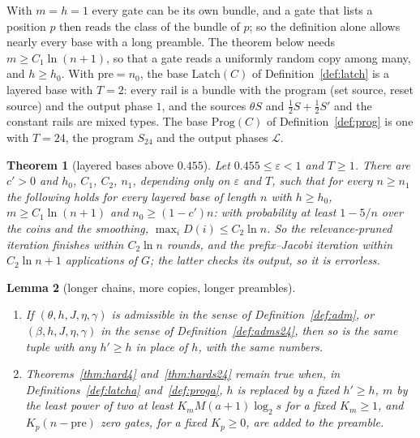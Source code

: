 \documentclass[11pt]{amsart}
\newtheorem{theorem}{Theorem}
\newtheorem{lemma}[theorem]{Lemma}
\theoremstyle{definition}
\theoremstyle{remark}
\newcommand{\eps}{\varepsilon}
\begin{document}
\noindent With $m=h=1$ every gate can be its own bundle, and a gate that lists a position $p$ then
reads the class of the bundle of $p$; so the definition alone allows nearly every base with a
long preamble. The theorem below needs $m\ge C_1\ln(n+1)$, so that a gate reads a uniformly random
copy among many, and $h\ge h_0$. With $\mathrm{pre}=n_0$, the base $\mathrm{Latch}(C)$ of
Definition~\ref{def:latch} is a layered base with $T=2$: every rail is a bundle with the program (set source, reset source) and
the output phase $1$, and the sources $\theta S$ and $\frac12S+\frac12S'$ and the constant rails are
mixed types. The base $\mathrm{Prog}(C)$ of Definition~\ref{def:prog} is one with $T=24$, the
program $S_{24}$ and the output phases $\mathcal L$.

\begin{theorem}[layered bases above $0.455$]\label{thm:layered}
Let $0.455\le\eps<1$ and $T\ge1$. There are $c'>0$ and $h_0$, $C_1$, $C_2$, $n_1$, depending only on
$\eps$ and $T$, such that for every $n\ge n_1$ the following holds for every layered base of length
$n$ with $h\ge h_0$, $m\ge C_1\ln(n+1)$ and $n_0\ge(1-c')n$: with probability at least $1-5/n$ over
the coins and the smoothing, $\max_iD(i)\le C_2\ln n$. So the relevance-pruned iteration finishes
within $C_2\ln n$ rounds, and the prefix--Jacobi iteration within $C_2\ln n+1$ applications of $G$;
the latter checks its output, so it is errorless.
\end{theorem}

\begin{lemma}[longer chains, more copies, longer preambles]\label{lem:longer}
\begin{enumerate}[label=(\alph*),leftmargin=2.4em]
\item If $(\theta,h,J,\eta,\gamma)$ is admissible in the sense of Definition~\ref{def:adm}, or
$(\beta,h,J,\eta,\gamma)$ in the sense of Definition~\ref{def:adms24}, then so is the same tuple with
any $h'\ge h$ in place of $h$, with the same numbers.
\item Theorems~\ref{thm:hard4} and~\ref{thm:hards24} remain true when, in
Definitions~\ref{def:latcha} and~\ref{def:proga}, $h$ is replaced by a fixed $h'\ge h$, $m$ by the
least power of two at least $K_mM(a+1)\log_2s$ for a fixed $K_m\ge1$, and $K_p(n-\mathrm{pre})$
zero gates, for a fixed $K_p\ge0$, are added to the preamble.
\end{enumerate}
\end{lemma}
\end{document}
